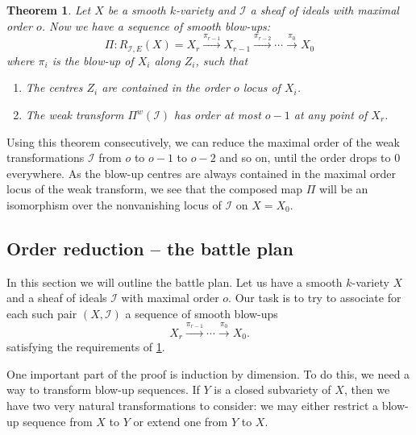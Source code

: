 \documentclass[12pt,a4paper,leqno]{article}
\newcommand{\fref}[1]{\hyperref[{#1}]{\ref*{#1}}}
\theoremstyle{plain}
\newtheorem{thm}[theo]{Theorem}
\theoremstyle{definition}
\theoremstyle{remark}
\begin{document}
\begin{thm}\label{OrderReduction1}
Let $X$ be a smooth $k$-variety and $\mathscr{I}$ a sheaf of ideals with maximal order $o$. Now we have a sequence of smooth blow-ups:
\begin{equation*}
\Pi: R_{\mathscr{I},E} (X) = X_r \stackrel{\pi_{r-1}}{\to} X_{r-1} \stackrel{\pi_{r-2}}{\to} \cdots \stackrel{\pi_{0}}{\to} X_0
\end{equation*}
where $\pi_i$ is the blow-up of $X_i$ along $Z_i$, such that
\begin{enumerate}
\item The centres $Z_i$ are contained in the order $o$ locus of $X_i$.
\item The weak transform $\Pi^{w}(\mathscr{I})$ has order at most $o-1$ at any point of $X_r$.
\end{enumerate}
\end{thm}

Using this theorem consecutively, we can reduce the maximal order of the weak transformations  $\mathscr{I}$ from $o$ to $o-1$ to $o-2$ and so on, until the order drops to $0$ everywhere. As the blow-up centres are always contained in the maximal order locus of the weak transform, we see that the composed map $\Pi$ will be an isomorphism over the nonvanishing locus of $\mathscr{I}$ on $X=X_0$.

\subsection{Order reduction -- the battle plan}

In this section we will outline the battle plan. Let us have a smooth $k$-variety $X$ and a sheaf of ideals $\mathscr{I}$ with maximal order $o$. Our task is to try to associate for each such pair $(X,\mathscr{I})$ a sequence of smooth blow-ups 
\begin{equation*}
X_r \stackrel{\pi_{r-1}}{\to} \cdots \stackrel{\pi_0}{\to} X_0.
\end{equation*}
satisfying the requirements of \fref{OrderReduction1}.

One important part of the proof is induction by dimension. To do this, we need a way to transform blow-up sequences. If $Y$ is a closed subvariety of $X$, then we have two very natural transformations to consider: we may either restrict a blow-up sequence from $X$ to $Y$ or extend one from $Y$ to $X$.
\end{document}
